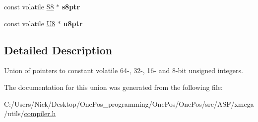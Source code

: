 \begin{DoxyCompactItemize}
\item 
\hypertarget{union_union_c_v_ptr_ab5a1808ed01b80dd091bbd5a1f69532b}{const volatile \hyperlink{group__group__xmega__utils_gaf1475a0bb1962ef08dd1f78bd5dba87a}{S8} $\ast$ {\bfseries s8ptr}}\label{union_union_c_v_ptr_ab5a1808ed01b80dd091bbd5a1f69532b}

\item 
\hypertarget{union_union_c_v_ptr_ae30b8d90cf4023021a2ae90829d783b9}{const volatile \hyperlink{group__group__xmega__utils_gaa63ef7b996d5487ce35a5a66601f3e73}{U8} $\ast$ {\bfseries u8ptr}}\label{union_union_c_v_ptr_ae30b8d90cf4023021a2ae90829d783b9}

\end{DoxyCompactItemize}


\subsection{Detailed Description}
Union of pointers to constant volatile 64-\/, 32-\/, 16-\/ and 8-\/bit unsigned integers. 

The documentation for this union was generated from the following file\-:\begin{DoxyCompactItemize}
\item 
C\-:/\-Users/\-Nick/\-Desktop/\-One\-Pos\-\_\-programming/\-One\-Pos/\-One\-Pos/src/\-A\-S\-F/xmega/utils/\hyperlink{compiler_8h}{compiler.\-h}\end{DoxyCompactItemize}
